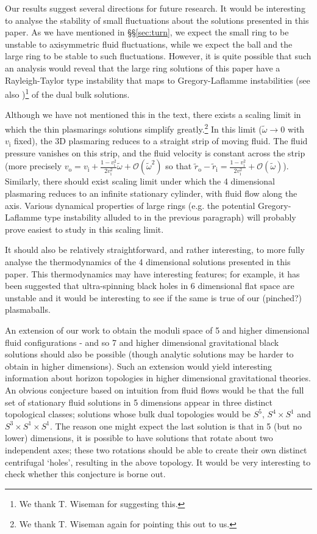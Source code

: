 \documentclass[12pt,a4paper]{article}
\newcommand{\ra}{\rightarrow}
\newcommand{\CO}{\mathcal{O}}
\newcommand{\vi}{v_\mathrm{i}}
\newcommand{\vo}{v_\mathrm{o}}
\newcommand{\z}{\tilde{r}}
\newcommand{\zi}{\z_\mathrm{i}}
\newcommand{\zo}{\z_\mathrm{o}}
\newcommand{\tw}{\widetilde{\omega}}
\begin{document}
Our results suggest several directions for future research. It would
be interesting to analyse the stability of small fluctuations about
the solutions presented in this paper. As we have mentioned in
\S\S\ref{sec:turn}, we expect the small ring to be unstable to
axisymmetric fluid fluctuations, while we expect the ball and the
large ring to be stable to such fluctuations. However, it is quite
possible that such an analysis would reveal that the large ring
solutions of this paper have a Rayleigh-Taylor type instability that
maps to Gregory-Laflamme instabilities (see also
\cite{Cardoso:2006ks})\footnote{We thank T. Wiseman for suggesting
this.} of the dual bulk solutions.

Although we have not mentioned this in the text, there exists a
scaling limit in which the thin plasmarings solutions simplify
greatly.\footnote{We thank T. Wiseman again for pointing this out to
us.} In this limit ($\tw \ra 0$ with $\vi$ fixed), the 3D plasmaring
reduces to a straight strip of moving fluid. The fluid
pressure vanishes on this strip, and the fluid velocity is constant
across the strip (more precisely $\vo = \vi +
\frac{1-\vi^2}{2\vi^2}\tw + \CO(\tw^2)$ so that $\zo-\zi =
\frac{1-\vi^2}{2\vi^2} + \CO(\tw)$). Similarly, there should exist
scaling limit under which the 4 dimensional plasmaring reduces to an
infinite stationary cylinder, with fluid flow along the axis.
Various dynamical properties of large rings (e.g. the potential
Gregory-Laflamme type instability alluded to in the previous
paragraph) will probably prove easiest to study in this scaling
limit.

It should also be relatively straightforward, and rather
interesting, to more fully analyse the thermodynamics of the 4
dimensional solutions presented in this paper. This thermodynamics may
have interesting features; for  example, it has
been suggested that ultra-spinning black holes in 6 dimensional flat
space are unstable \cite{Emparan:2003sy} and it would be interesting
to see if the same is true of our (pinched?) plasmaballs.

An extension of our work to obtain the moduli space of 5 and higher
dimensional fluid configurations - and so 7 and higher dimensional
gravitational black solutions should also be possible (though
analytic solutions may be harder to obtain in higher dimensions).
Such an extension would yield interesting information about horizon
topologies in higher dimensional gravitational theories. An obvious
conjecture based on intuition from fluid flows would be that the
full set of stationary fluid solutions in 5 dimensions appear in
three distinct topological classes; solutions whose bulk dual
topologies would be $S^5$, $S^4\times S^1$ and $S^3\times S^1\times
S^1$. The reason one might expect the last solution is that in 5
(but no lower) dimensions, it is possible to have solutions that
rotate about two independent axes; these two rotations should be
able to create their own distinct centrifugal `holes', resulting in the
above topology. It would be
very interesting to check whether this conjecture is borne out.
\end{document}
